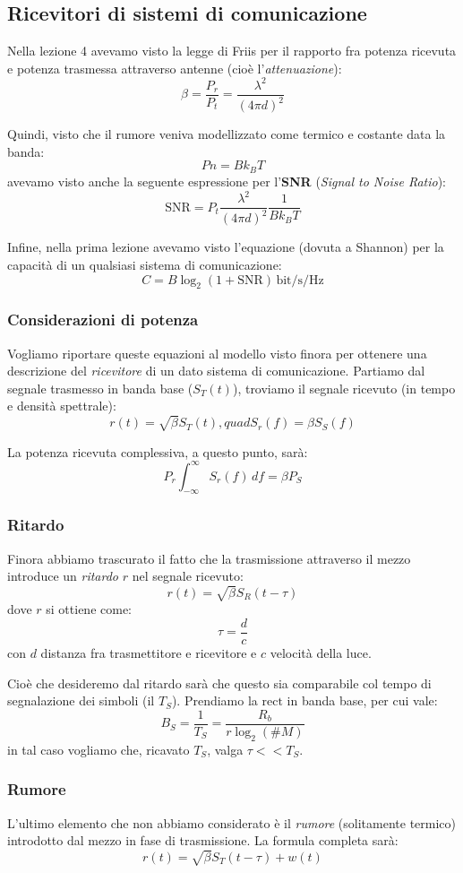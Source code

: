 \documentclass[a4paper,11pt]{article}
\begin{document}
\subsection{Ricevitori di sistemi di comunicazione}
Nella lezione 4 avevamo visto la legge di Friis per il rapporto fra potenza ricevuta e potenza trasmessa attraverso antenne (cioè l'\textit{attenuazione}):
$$
\beta = \frac{P_r}{P_t} = \frac{\lambda^2}{(4 \pi d)^2}
$$

Quindi, visto che il rumore veniva modellizzato come termico e costante data la banda:
$$
Pn = B k_B T
$$
avevamo visto anche la seguente espressione per l'\textbf{SNR} (\textit{Signal to Noise Ratio}):
$$
\mathrm{SNR} = P_t \frac{\lambda^2}{(4 \pi d)^2} \frac{1}{B k_B T}
$$

Infine, nella prima lezione avevamo visto l'equazione (dovuta a Shannon) per la capacità di un qualsiasi sistema di comunicazione:
$$
C = B \log_2(1 + \mathrm{SNR}) \, \mathrm{bit/s/Hz}
$$

\subsubsection{Considerazioni di potenza}
Vogliamo riportare queste equazioni al modello visto finora per ottenere una descrizione del \textit{ricevitore} di un dato sistema di comunicazione. Partiamo dal segnale trasmesso in banda base ($S_T(t)$), troviamo il segnale ricevuto (in tempo e densità spettrale):
$$
r(t) = \sqrt{\beta} S_T(t), quad S_r(f) = \beta S_S(f)
$$

La potenza ricevuta complessiva, a questo punto, sarà:
$$
P_r \int_{-\infty}^\infty S_r(f) \, df = \beta P_S
$$

\subsubsection{Ritardo}
Finora abbiamo trascurato il fatto che la trasmissione attraverso il mezzo introduce un \textit{ritardo} $r$ nel segnale ricevuto:
$$
r(t) = \sqrt{\beta} S_R (t - \tau)
$$
dove $r$ si ottiene come:
$$
\tau = \frac{d}{c}
$$
con $d$ distanza fra trasmettitore e ricevitore e $c$ velocità della luce.

Cioè che desideremo dal ritardo sarà che questo sia comparabile col tempo di segnalazione dei simboli (il $T_S$). Prendiamo la $\mathrm{rect}$ in banda base, per cui vale:
$$
B_S = \frac{1}{T_S} = \frac{R_b}{r \log_2(\# M)}
$$
in tal caso vogliamo che, ricavato $T_S$, valga $\tau << T_S$.

\subsubsection{Rumore}
L'ultimo elemento che non abbiamo considerato è il \textit{rumore} (solitamente termico) introdotto dal mezzo in fase di trasmissione. La formula completa sarà:
$$
r(t) = \sqrt{\beta} S_T(t - \tau) + w(t)
$$
\end{document}
